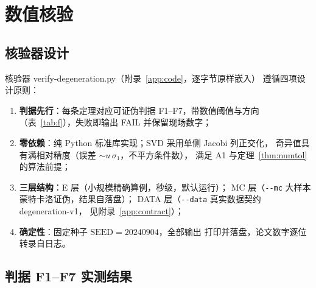 \documentclass[UTF8,11pt,a4paper]{ctexart}
\theoremstyle{plain}
\theoremstyle{definition}
\theoremstyle{remark}
\begin{document}
\section{数值核验}\label{sec:numverify}

\subsection{核验器设计}

核验器 \textsf{verify-degeneration.py}（附录~\ref{app:code}，逐字节原样嵌入）
遵循四项设计原则：
\begin{enumerate}
\item \textbf{判据先行}：每条定理对应可证伪判据 F1--F7，带数值阈值与方向
  （表~\ref{tab:f}），失败即输出 FAIL 并保留现场数字；
\item \textbf{零依赖}：纯 Python 标准库实现；SVD 采用单侧 Jacobi 列正交化，
  奇异值具有满相对精度（误差 $\sim u\,\sigma_1$，不平方条件数），
  满足 A1 与定理~\ref{thm:numtol} 的算法前提\cite{demmel1992,higham2002}；
\item \textbf{三层结构}：E 层（小规模精确算例，秒级，默认运行）；
  MC 层（\texttt{-{}-mc} 大样本蒙特卡洛证伪，结果自落盘）；
  DATA 层（\texttt{-{}-data} 真实数据契约 \textsf{degeneration-v1}，
  见附录~\ref{app:contract}）；
\item \textbf{确定性}：固定种子 $\mathrm{SEED}=20240904$，全部输出
  打印并落盘，论文数字逐位转录自日志。
\end{enumerate}

\subsection{判据 F1--F7 实测结果}
\end{document}
